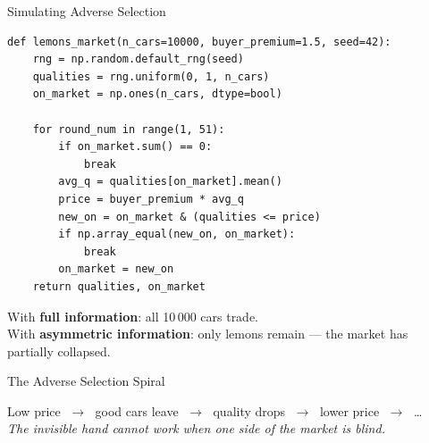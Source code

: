 \documentclass[aspectratio=169, 10pt]{beamer}
\begin{document}
\begin{frame}[fragile]{Simulating Adverse Selection}
\begin{lstlisting}
def lemons_market(n_cars=10000, buyer_premium=1.5, seed=42):
    rng = np.random.default_rng(seed)
    qualities = rng.uniform(0, 1, n_cars)
    on_market = np.ones(n_cars, dtype=bool)

    for round_num in range(1, 51):
        if on_market.sum() == 0:
            break
        avg_q = qualities[on_market].mean()
        price = buyer_premium * avg_q
        new_on = on_market & (qualities <= price)
        if np.array_equal(new_on, on_market):
            break
        on_market = new_on
    return qualities, on_market
\end{lstlisting}
\vspace{0.3em}
With \textbf{full information}: all 10\,000 cars trade.\\
With \textbf{asymmetric information}: only lemons remain --- the market
has \alert{partially collapsed}.
\end{frame}

\begin{frame}{The Adverse Selection Spiral}
\begin{center}
\end{center}
\vspace{0.5em}
\begin{center}
Low price $\;\to\;$ good cars leave $\;\to\;$ quality drops $\;\to\;$
lower price $\;\to\;$ \ldots\\[6pt]
\textit{The invisible hand cannot work when one side of the market is blind.}
\end{center}
\end{frame}
\end{document}
